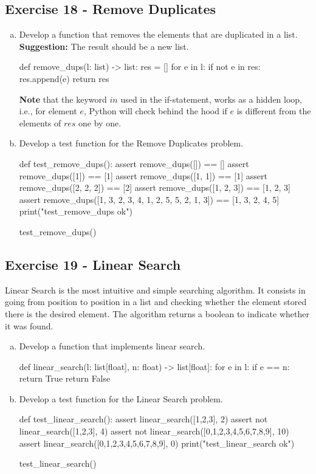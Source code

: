 \documentclass[12pt]{article}
\begin{document}
\subsection*{Exercise 18 - Remove Duplicates}
\begin{enumerate}[a)]
  \item Develop a function that removes the elements that are duplicated in a 
  list. \textbf{Suggestion:} The result should be a new list.
\begin{pythonlst}
def remove_dups(l: list) -> list:
  res = []
  for e in l:
    if not e in res:
      res.append(e)
  return res
\end{pythonlst}
\textbf{Note} that the keyword $in$ used in the if-statement, works as a hidden 
loop, i.e., for element $e$, Python will check behind the hood if $e$ is different
from the elements of $res$ one by one.
  \item Develop a test function for the Remove Duplicates problem.
\begin{pythonlst}
def test_remove_dups():
  assert remove_dups([]) == []
  assert remove_dups([1]) == [1]
  assert remove_dups([1, 1]) == [1]
  assert remove_dups([2, 2, 2]) == [2]
  assert remove_dups([1, 2, 3]) == [1, 2, 3]
  assert remove_dups([1, 3, 2, 3, 4, 1, 2, 5, 5, 2, 1, 3]) == [1, 3, 2, 4, 5]
  print("test_remove_dups ok")

test_remove_dups()
\end{pythonlst}
\end{enumerate}

\subsection*{Exercise 19 - Linear Search}
Linear Search is the most intuitive and simple searching algorithm. It consists
in going from position to position in a list and checking whether the element
stored there is the desired element. The algorithm returns a boolean to indicate
whether it was found.
\begin{enumerate}[a)]
  \item Develop a function that implements linear search.
\begin{pythonlst}
def linear_search(l: list[float], n: float) -> list[float]:
  for e in l:
    if e == n:
      return True
  return False
\end{pythonlst}
  \item Develop a test function for the Linear Search problem.
\begin{pythonlst}
def test_linear_search():
  assert linear_search([1,2,3], 2)
  assert not linear_search([1,2,3], 4)
  assert not linear_search([0,1,2,3,4,5,6,7,8,9], 10)
  assert linear_search([0,1,2,3,4,5,6,7,8,9], 0)
  print("test_linear_search ok")

test_linear_search()
\end{pythonlst}
\end{enumerate}
\end{document}
